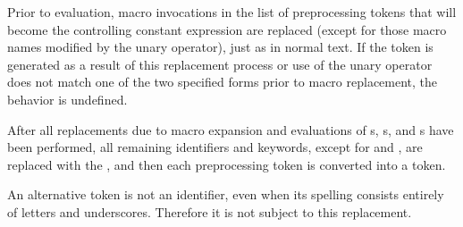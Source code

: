 \documentclass{wg21}
\begin{document}
\pnum
Prior to evaluation,
macro invocations in the list of preprocessing tokens
that will become the controlling constant expression
are replaced
(except for those macro names modified by the
unary operator),
just as in normal text.
If the token
is generated as a result of this replacement process
or use of the
unary operator does not match one of the two specified forms
prior to macro replacement,
the behavior is undefined.

\pnum
After all replacements due to macro expansion and
evaluations of
s,
s, and
s
have been performed,
all remaining identifiers and keywords,
except for
and
,
are replaced with the 
,
and then each preprocessing token is converted into a token.
\begin{note}
    An alternative
    token is not an identifier,
    even when its spelling consists entirely of letters and underscores.
    Therefore it is not subject to this replacement.
\end{note}
\end{document}
